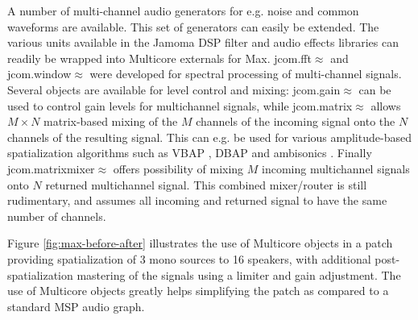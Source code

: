 \documentclass[twoside,a4paper]{article}
\begin{document}
A number of multi-channel audio generators for e.g. noise and common waveforms are available.
This set of generators can easily be extended.
The various units available in the Jamoma DSP filter and audio effects libraries can readily be wrapped into Multicore externals for Max.
jcom.fft$\approx$ and jcom.window$\approx$ were developed for spectral processing of multi-channel signals.
Several objects are available for level control and mixing: 
jcom.gain$\approx$ can be used to control gain levels for multichannel signals, while jcom.matrix$\approx$ allows $M \times N$ matrix-based mixing of the $M$ channels of the incoming signal onto the $N$ channels of the resulting signal. This can e.g. be used for various amplitude-based spatialization algorithms such as VBAP \cite{Pulkki:1997vbap}, DBAP \cite{lossius:2009} and ambisonics \cite{Schacher:2006ambi_max}.
Finally jcom.matrixmixer$\approx$ offers possibility of mixing $M$ incoming multichannel signals onto $N$ returned multichannel signal.
This combined mixer/router is still rudimentary, and assumes all incoming and returned signal to have the same number of channels.

Figure \ref{fig:max-before-after} illustrates the use of Multicore objects in a patch providing spatialization of 3 mono sources to 16 speakers, with additional post-spatialization mastering of the signals using a limiter and gain adjustment.
The use of Multicore objects greatly helps simplifying the patch as compared to a standard MSP audio graph. 


\end{document}
